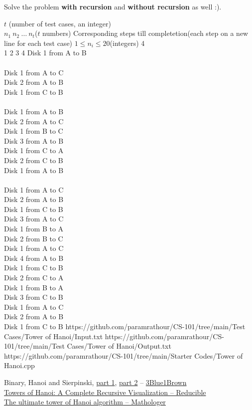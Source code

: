 Solve the problem \textbf{with recursion} and \textbf{without recursion} as well :).
\begin{testcasesMore}
	{$t$ \hfill(number of test cases, an integer)\\$n_1\ n_2\ \ldots \ n_t$\hfill($t$ numbers)}
	{Corresponding steps till completetion\hfill(each step on a new line for each test case)}
	{$1\leq n_i \leq 20$\hfill(integers)}
	{4\\1 2 3 4}
	{Disk 1 from A to B\\\\
	Disk 1 from A to C\\
	Disk 2 from A to B\\
	Disk 1 from C to B\\\\
	Disk 1 from A to B\\
	Disk 2 from A to C\\
	Disk 1 from B to C\\
	Disk 3 from A to B\\
	Disk 1 from C to A\\
	Disk 2 from C to B\\
	Disk 1 from A to B\\\\
	Disk 1 from A to C\\
	Disk 2 from A to B\\
	Disk 1 from C to B\\
	Disk 3 from A to C\\
	Disk 1 from B to A\\
	Disk 2 from B to C\\
	Disk 1 from A to C\\
	Disk 4 from A to B\\
	Disk 1 from C to B\\
	Disk 2 from C to A\\
	Disk 1 from B to A\\
	Disk 3 from C to B\\
	Disk 1 from A to C\\
	Disk 2 from A to B\\
	Disk 1 from C to B}
	{https://github.com/paramrathour/CS-101/tree/main/Test Cases/Tower of Hanoi/Input.txt}
	{https://github.com/paramrathour/CS-101/tree/main/Test Cases/Tower of Hanoi/Output.txt}
	{https://github.com/paramrathour/CS-101/tree/main/Starter Codes/Tower of Hanoi.cpp}
\end{testcasesMore}
\begin{funvideo}
	Binary, Hanoi and Sierpinski, \href{https://youtu.be/2SUvWfNJSsM}{part 1}, \href{https://youtu.be/bdMfjfT0lKk}{part 2} -- \href{https://www.youtube.com/@3blue1brown}{3Blue1Brown}\\
	\href{https://youtu.be/rf6uf3jNjbo}{Towers of Hanoi: A Complete Recursive Visualization -- Reducible}\\
	\href{https://youtu.be/MbonokcLbNo}{The ultimate tower of Hanoi algorithm -- Mathologer}
\end{funvideo}
\recalctypearea
